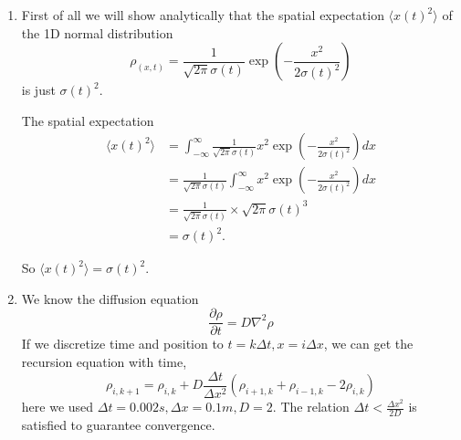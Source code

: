 \documentclass[aps,prl,preprint,superscriptaddress]{revtex4}
\begin{document}
\begin{enumerate}
\item First of all we will show analytically that the spatial expectation $\langle x(t)^2\rangle$ of the 1D normal distribution 
\begin{equation}
\rho_{(x,t)}=\frac{1}{\sqrt{2\pi}\sigma{(t)}}\exp(-\frac{x^2}{2\sigma{(t)}^2})
\end{equation}
is just $\sigma(t)^2$.

The spatial expectation
\begin{equation}
\begin{split}
\langle x(t)^2\rangle&=\int_{-\infty}^{\infty}\frac{1}{\sqrt{2\pi}\sigma(t)}x^2\exp(-\frac{x^2}{2\sigma(t)^2})dx\\
&=\frac{1}{\sqrt{2\pi}\sigma(t)}\int_{-\infty}^{\infty}x^2\exp(-\frac{x^2}{2\sigma(t)^2})dx\\
&=\frac{1}{\sqrt{2\pi}\sigma(t)}\times \sqrt{2\pi}\sigma(t)^3\\
&=\sigma(t)^2.
\end{split}
\end{equation}

So $\langle x(t)^2\rangle=\sigma(t)^2$.
\item We know the diffusion equation
\begin{equation}
\frac{\partial\rho}{\partial t}=D\nabla^2\rho
\end{equation}
If we discretize time and position to $t=k\Delta t, x=i\Delta x$, we can get the recursion equation with time, 
\begin{equation}
\rho_{i,k+1}=\rho_{i,k}+D\frac{\Delta t}{\Delta x^2}(\rho_{i+1,k}+\rho_{i-1,k}-2\rho_{i,k})
\end{equation}
here we used $\Delta t=0.002s, \Delta x=0.1m, D=2$. The relation $\Delta t<\frac{\Delta x^2}{2D}$ is satisfied to guarantee convergence.

\end{enumerate}
\end{document}
